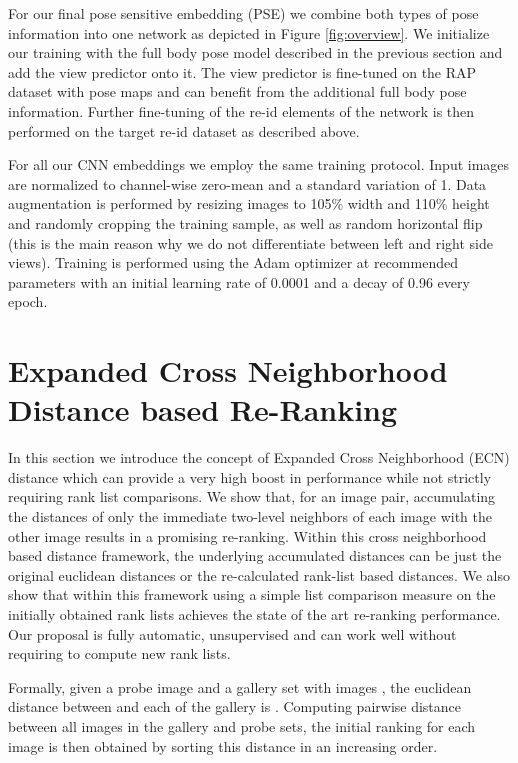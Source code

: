 \documentclass[10pt,twocolumn,letterpaper]{article}
\begin{document}
For our final pose sensitive embedding (PSE) we combine both types of pose information into one network as depicted in Figure \ref{fig:overview}.
We initialize our training with the full body pose model described in the previous section and add the view predictor onto it. The view predictor is fine-tuned on the RAP dataset with pose maps and can benefit from the additional full body pose information. Further fine-tuning of the re-id elements of the network is then performed on the target re-id dataset as described above.

For all our CNN embeddings we employ the same training protocol. Input images are normalized to channel-wise zero-mean and a standard variation of 1. Data augmentation is performed by resizing images to 105\% width and 110\% height and randomly cropping the training sample, as well as random horizontal flip (this is the main reason why we do not differentiate between left and right side views). Training is performed using the Adam optimizer at recommended parameters with an initial learning rate of 0.0001 and a decay of 0.96 every epoch.

\section{Expanded Cross Neighborhood Distance based Re-Ranking}
\label{sec:ECN}
In this section we introduce the concept of Expanded Cross Neighborhood (ECN) distance which can provide a very high boost in performance while not strictly requiring rank list comparisons. We show that, for an image pair, accumulating the distances of only the immediate two-level neighbors of each image with the other image results in a promising re-ranking. Within this cross neighborhood based distance framework, the underlying accumulated distances can be just the original euclidean distances or the re-calculated rank-list based distances. We also show that within this framework using a simple list comparison measure on the initially obtained rank lists achieves the state of the art re-ranking performance. Our proposal is fully automatic, unsupervised and can work well without requiring to compute new rank lists.

Formally, given a probe image  and a gallery set  with  images , the euclidean distance between  and each of the gallery  is . Computing pairwise distance between all images in the gallery and probe sets, the initial ranking  for each image is then obtained by sorting this distance in an increasing order. 
\end{document}
